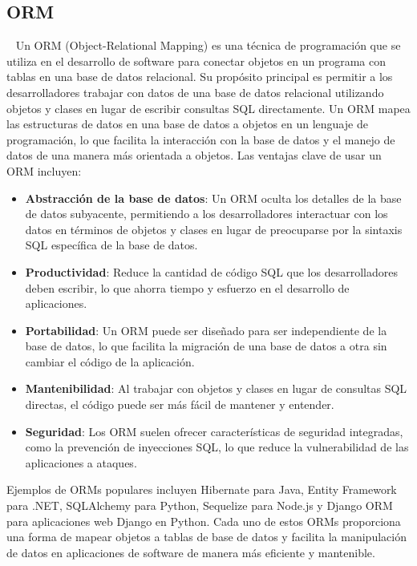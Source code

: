 \subsection{ORM}~\cite{fowler2012patterns}
Un ORM (Object-Relational Mapping) es una técnica de programación que se utiliza en el desarrollo de software para conectar objetos en un programa con tablas en una base de datos relacional. Su propósito principal es permitir a los desarrolladores trabajar con datos de una base de datos relacional utilizando objetos y clases en lugar de escribir consultas SQL directamente. Un ORM mapea las estructuras de datos en una base de datos a objetos en un lenguaje de programación, lo que facilita la interacción con la base de datos y el manejo de datos de una manera más orientada a objetos.
Las ventajas clave de usar un ORM incluyen:
\begin{itemize}
    \item \textbf{Abstracción de la base de datos}: Un ORM oculta los detalles de la base de datos subyacente, permitiendo a los desarrolladores interactuar con los datos en términos de objetos y clases en lugar de preocuparse por la sintaxis SQL específica de la base de datos.
    \item \textbf{Productividad}: Reduce la cantidad de código SQL que los desarrolladores deben escribir, lo que ahorra tiempo y esfuerzo en el desarrollo de aplicaciones.
    \item \textbf{Portabilidad}: Un ORM puede ser diseñado para ser independiente de la base de datos, lo que facilita la migración de una base de datos a otra sin cambiar el código de la aplicación.
    \item \textbf{Mantenibilidad}: Al trabajar con objetos y clases en lugar de consultas SQL directas, el código puede ser más fácil de mantener y entender.
    \item \textbf{Seguridad}: Los ORM suelen ofrecer características de seguridad integradas, como la prevención de inyecciones SQL, lo que reduce la vulnerabilidad de las aplicaciones a ataques. 
\end{itemize}
Ejemplos de ORMs populares incluyen Hibernate para Java, Entity Framework para .NET, 
SQLAlchemy para Python, Sequelize para Node.js y Django ORM para aplicaciones web Django en Python. Cada uno de estos ORMs proporciona una forma de mapear objetos a tablas de base de datos y facilita la manipulación de datos en aplicaciones de software de manera más eficiente y mantenible.

